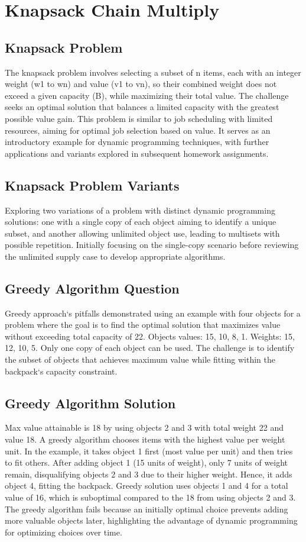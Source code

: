 \section*{Knapsack    Chain Multiply}

\subsection*{Knapsack Problem}
The knapsack problem involves selecting a subset of n items, each with an integer weight (w1 to wn) and value (v1 to vn), so their combined weight does not exceed a given capacity (B), while maximizing their total value.
The challenge seeks an optimal solution that balances a limited capacity with the greatest possible value gain.
This problem is similar to job scheduling with limited resources, aiming for optimal job selection based on value.
It serves as an introductory example for dynamic programming techniques, with further applications and variants explored in subsequent homework assignments.

\subsection*{Knapsack Problem Variants}
Exploring two variations of a problem with distinct dynamic programming solutions: one with a single copy of each object aiming to identify a unique subset, and another allowing unlimited object use, leading to multisets with possible repetition.
Initially focusing on the single-copy scenario before reviewing the unlimited supply case to develop appropriate algorithms.

\subsection*{Greedy Algorithm  Question}
Greedy approach`s pitfalls demonstrated using an example with four objects for a problem where the goal is to find the optimal solution that maximizes value without exceeding total capacity of 22.
Objects values: 15, 10, 8, 1.
Weights: 15, 12, 10, 5.
Only one copy of each object can be used.
The challenge is to identify the subset of objects that achieves maximum value while fitting within the backpack`s capacity constraint.

\subsection*{Greedy Algorithm  Solution}
Max value attainable is 18 by using objects 2 and 3 with total weight 22 and value 18.
A greedy algorithm chooses items with the highest value per weight unit.
In the example, it takes object 1 first (most value per unit) and then tries to fit others.
After adding object 1 (15 units of weight), only 7 units of weight remain, disqualifying objects 2 and 3 due to their higher weight.
Hence, it adds object 4, fitting the backpack.
Greedy solution uses objects 1 and 4 for a total value of 16, which is suboptimal compared to the 18 from using objects 2 and 3.
The greedy algorithm fails because an initially optimal choice prevents adding more valuable objects later, highlighting the advantage of dynamic programming for optimizing choices over time.

